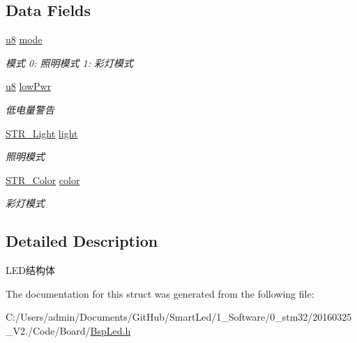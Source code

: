 \subsection*{\-Data \-Fields}
\begin{DoxyCompactItemize}
\item 
\hypertarget{struct_s_t_r___led_a7cea6ae40aa46b41e3806213a39718c6}{\hyperlink{group___b_s_p_gaed742c436da53c1080638ce6ef7d13de}{u8} \hyperlink{struct_s_t_r___led_a7cea6ae40aa46b41e3806213a39718c6}{mode}}\label{struct_s_t_r___led_a7cea6ae40aa46b41e3806213a39718c6}

\begin{DoxyCompactList}\small\item\em 模式 0\-: 照明模式 1\-: 彩灯模式 \end{DoxyCompactList}\item 
\hypertarget{struct_s_t_r___led_a3374be72e62e43e5be161064634e0d47}{\hyperlink{group___b_s_p_gaed742c436da53c1080638ce6ef7d13de}{u8} \hyperlink{struct_s_t_r___led_a3374be72e62e43e5be161064634e0d47}{low\-Pwr}}\label{struct_s_t_r___led_a3374be72e62e43e5be161064634e0d47}

\begin{DoxyCompactList}\small\item\em 低电量警告 \end{DoxyCompactList}\item 
\hypertarget{struct_s_t_r___led_a4d1c6fc5132497927800baf393059b9c}{\hyperlink{struct_s_t_r___light}{\-S\-T\-R\-\_\-\-Light} \hyperlink{struct_s_t_r___led_a4d1c6fc5132497927800baf393059b9c}{light}}\label{struct_s_t_r___led_a4d1c6fc5132497927800baf393059b9c}

\begin{DoxyCompactList}\small\item\em 照明模式 \end{DoxyCompactList}\item 
\hypertarget{struct_s_t_r___led_a49cdb3444aea60f4974aea29c9e652e9}{\hyperlink{struct_s_t_r___color}{\-S\-T\-R\-\_\-\-Color} \hyperlink{struct_s_t_r___led_a49cdb3444aea60f4974aea29c9e652e9}{color}}\label{struct_s_t_r___led_a49cdb3444aea60f4974aea29c9e652e9}

\begin{DoxyCompactList}\small\item\em 彩灯模式 \end{DoxyCompactList}\end{DoxyCompactItemize}


\subsection{\-Detailed \-Description}
\-L\-E\-D结构体 

\-The documentation for this struct was generated from the following file\-:\begin{DoxyCompactItemize}
\item 
\-C\-:/\-Users/admin/\-Documents/\-Git\-Hub/\-Smart\-Led/1\-\_\-\-Software/0\-\_\-stm32/20160325\-\_\-\-V2./\-Code/\-Board/\hyperlink{_bsp_led_8h}{\-Bsp\-Led.\-h}\end{DoxyCompactItemize}
